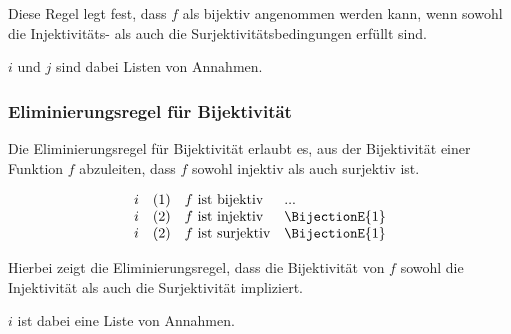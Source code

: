 \documentclass[main.tex]{subfiles}
\begin{document}
Diese Regel legt fest, dass \( f \) als bijektiv angenommen werden kann, wenn sowohl die Injektivitäts- als auch die Surjektivitätsbedingungen erfüllt sind.

\(i\) und \(j\) sind dabei Listen von Annahmen.

\subsubsection*{Eliminierungsregel für Bijektivität}
\label{rule:BijectionE}

Die Eliminierungsregel für Bijektivität erlaubt es, aus der Bijektivität einer Funktion \( f \) abzuleiten, dass \( f \) sowohl injektiv als auch surjektiv ist.

\[
\begin{array}{llll}
    i       & (1) & f \text{ ist bijektiv} & ... \\
    i       & (2) & f \text{ ist injektiv} & \BijectionE{1}\\
    i       & (2) & f \text{ ist surjektiv} & \BijectionE{1}
\end{array}
\]

Hierbei zeigt die Eliminierungsregel, dass die Bijektivität von \( f \) sowohl die Injektivität als auch die Surjektivität impliziert.

\(i\) ist dabei eine Liste von Annahmen.
\end{document}
